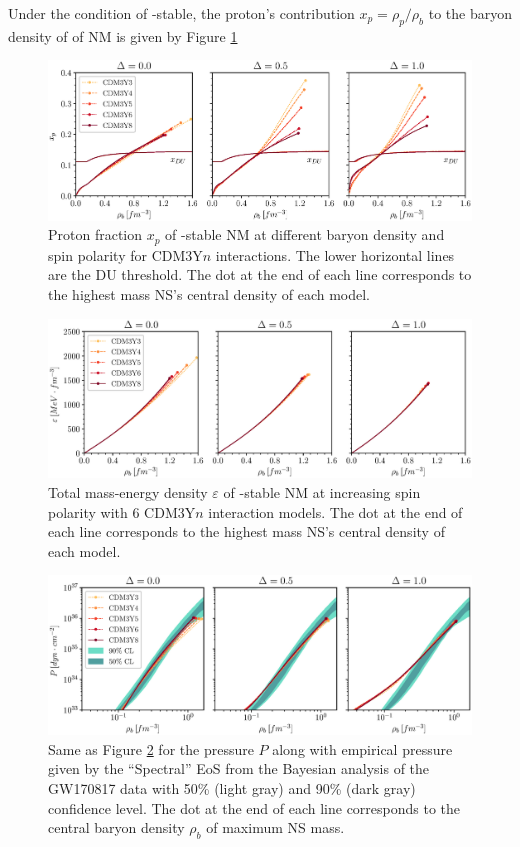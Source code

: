 Under the condition of \textbeta-stable, the proton's contribution $x_p = \rho_p/\rho_b$ to the baryon density of of \gls{NM} is given by Figure \ref{fig:xp}
\begin{figure}[ht!]
        \centering
        \includegraphics[width=\textwidth]{fig/xp.eps}
        \caption{Proton fraction $x_p$ of \textbeta-stable \gls{NM} at different baryon density and spin polarity for CDM3Y$n$ interactions. The lower horizontal lines are the \gls{DU} threshold. The dot at the end of each line corresponds to the highest mass \gls{NS}'s central density of each model.}
        \label{fig:xp}
\end{figure} 
\begin{figure}[ht!]
        \centering
        \includegraphics[width=\textwidth]{fig/E.eps}
        \caption{Total mass-energy density $\varepsilon$ of \textbeta-stable \gls{NM} at increasing spin polarity with 6 CDM3Y$n$ interaction models. The dot at the end of each line corresponds to the highest mass \gls{NS}'s central density of each model.}
        \label{fig:e}
\end{figure} 
\begin{figure}[ht!]
        \centering
        \includegraphics[width=\textwidth]{fig/P.eps}
        \caption{Same as Figure \ref{fig:e} for the pressure $P$ along with empirical pressure given by the ``Spectral'' \gls{EoS} from the Bayesian analysis of the GW170817 data \citep{abbott2018gw170817} with 50\% (light gray) and 90\% (dark gray) confidence level. The dot at the end of each line corresponds to the central baryon density $\rho_b$ of maximum \gls{NS} mass.}
        \label{fig:p}
\end{figure} 
